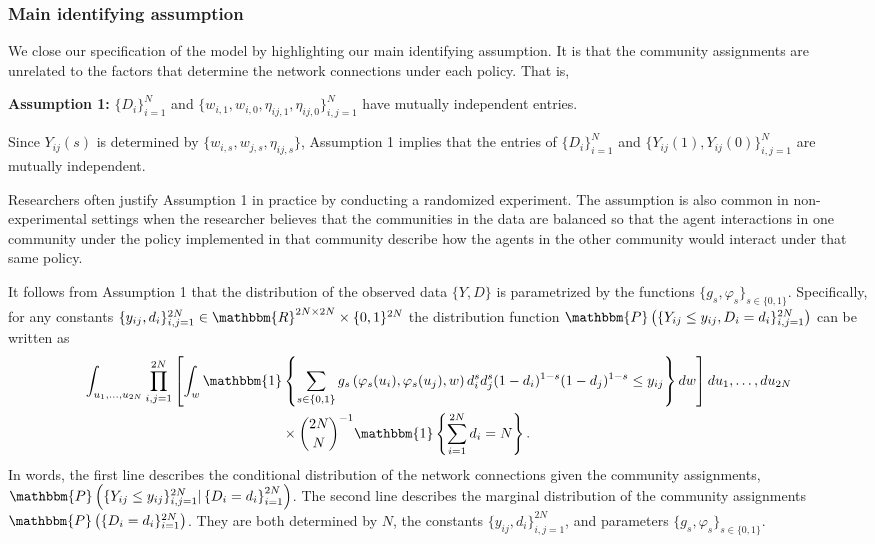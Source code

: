 \documentclass[12pt]{article}
\theoremstyle{definition}
\begin{document}
\subsubsection{Main identifying assumption}
We close our specification of the model by highlighting our main identifying assumption. It is that the community assignments are unrelated to the factors that determine the network connections under each policy. That is,   
\begin{flushleft}
\textbf{Assumption 1:}  $\{D_i\}_{i=1}^{N}$ and $\{w_{i,1},w_{i,0},\eta_{ij,1},\eta_{ij,0}\}_{i,j=1}^{N}$ have mutually independent entries. 
\end{flushleft}
Since $Y_{ij}(s)$ is determined by $\{w_{i,s},w_{j,s},\eta_{ij,s}\}$, Assumption 1 implies that the entries of $\{D_i\}_{i=1}^{N}$ and $\{Y_{ij}(1), Y_{ij}(0)\}_{i,j=1}^{N}$ are mutually independent.  

Researchers often justify Assumption 1 in practice by conducting a randomized experiment. The assumption is also common in non-experimental settings when the researcher believes that the communities in the data are balanced so that the agent interactions in one community under the policy implemented in that community describe how the agents in the other community would interact under that same policy.  

It follows from Assumption 1 that the distribution of the observed data $\{Y,D\}$ is parametrized by the functions $\{g_s,\varphi_s\}_{s \in \{0,1\}}$. Specifically, for any constants $\{y_{ij}, d_i\}_{i,j=1}^{2N} \in \mathbbm{R}^{2N\times 2N}\times \{0,1\}^{2N}$ the distribution function $\mathbbm{P}\left(\{Y_{ij} \leq y_{ij}, D_i = d_i\}_{i,j=1}^{2N}\right)$ can be written as  
\begin{align}\label{df}
&\int_{u_1,\ldots,u_{2N}}\prod_{i,j=1}^{2N}\left[ \int_{w}\mathbbm{1}\left\{\sum_{s \in \{0,1\}}g_{s}\left(\varphi_{s}(u_i),\varphi_s(u_j),w\right)d_i^sd_j^s(1-d_i)^{1-s}(1-d_j)^{1-s} \leq y_{ij}\right\}dw\right] du_1,\ldots,du_{2N} \nonumber \\
&\hspace{50mm}\times {2N\choose N}^{-1}\mathbbm{1}\left\{\sum_{i=1}^{2N}d_i = N\right\}.
\end{align}
In words, the first line describes the conditional distribution of the network connections given the community assignments, $\mathbbm{P}\left(\{Y_{ij} \leq y_{ij}\}_{i,j=1}^{2N}|\left\{D_i = d_i\right\}_{i=1}^{2N}\right)$. The second line describes the marginal distribution of the community assignments $\mathbbm{P}\left(\{D_i = d_i\}_{i=1}^{2N}\right)$. They are both determined by $N$, the constants $\{y_{ij}, d_i\}_{i,j=1}^{2N}$, and parameters $\{g_s,\varphi_s\}_{s \in \{0,1\}}$. 
\end{document}
